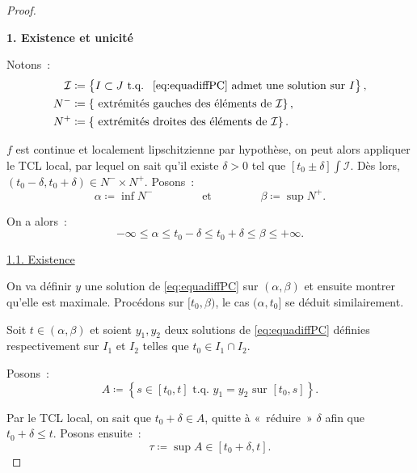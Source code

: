 \documentclass{report}
\theoremstyle{definition}
\theoremstyle{remark}
\numberwithin{equation}{section}
\newcommand{\tq}{\text{ t.q. }}
\newcommand{\minfty}{{-\infty}}
\newcommand{\pinfty}{{+\infty}}
\begin{document}
			\begin{proof}~

			\textbf{1. Existence et unicité}

				Notons~:
				\begin{align}
					\mathcal I &\coloneqq \left\{I \subset J \tq \text{ \eqref{eq:equadiffPC} admet une solution sur } I\right\}, \\
					N^- &\coloneqq \left\{\text{ extrémités gauches des éléments de } \mathcal I\right\}, \\
					N^+ &\coloneqq \left\{\text{ extrémités droites des éléments de } \mathcal I\right\}.
				\end{align}

				$f$ est continue et localement lipschitzienne par hypothèse, on peut alors appliquer le TCL local, par lequel on sait qu'il existe $\delta > 0$
				tel que $[t_0 \pm \delta] \int \mathcal I$. Dès lors, $(t_0-\delta, t_0+\delta) \in N^- \times N^+$. Posons~:
				\begin{equation}
					\alpha \coloneqq \inf N^- \qquad\qquad \text{ et } \qquad\qquad \beta \coloneqq \sup N^+.
				\end{equation}

				On a alors~:
				\begin{equation}
					\minfty \leq \alpha \leq t_0-\delta \leq t_0+\delta \leq \beta \leq \pinfty.
				\end{equation}

				\underline{1.1. Existence}

					On va définir $y$ une solution de \eqref{eq:equadiffPC} sur $(\alpha, \beta)$ et ensuite montrer qu'elle est maximale. Procédons sur
					$[t_0, \beta)$, le cas $(\alpha, t_0]$ se déduit similairement.

					Soit $t \in (\alpha, \beta)$ et soient $y_1, y_2$ deux solutions de \eqref{eq:equadiffPC} définies respectivement sur $I_1$ et $I_2$ telles
					que $t_0 \in I_1 \cap I_2$.

					Posons~:
					\begin{equation}
						A \coloneqq \left\{s \in [t_0, t] \tq y_1 = y_2 \text { sur } [t_0, s]\right\}.
					\end{equation}

					Par le TCL local, on sait que $t_0 + \delta \in A$, quitte à «~réduire~» $\delta$ afin que $t_0+\delta \leq t$. Posons ensuite~:
					\begin{equation}
						\tau \coloneqq \sup A \in [t_0+\delta, t].
					\end{equation}


\end{proof}
\end{document}
